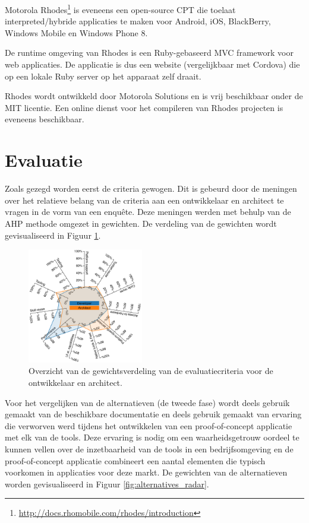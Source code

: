 \documentclass[a4paper]{IEEEconf}
\begin{document}
Motorola Rhodes\footnote{\url{http://docs.rhomobile.com/rhodes/introduction}} is eveneens een open-source CPT die toelaat interpreted/hybride applicaties te maken voor Android, iOS, BlackBerry, Windows Mobile en Windows Phone 8. 

De runtime omgeving van Rhodes is een Ruby-gebaseerd MVC framework voor web applicaties. De applicatie is dus een website (vergelijkbaar met Cordova) die op een lokale Ruby server op het apparaat zelf draait. 

Rhodes wordt ontwikkeld door Motorola Solutions en is vrij beschikbaar onder de MIT licentie. Een online dienst voor het compileren van Rhodes projecten is eveneens beschikbaar.

\section{Evaluatie}

Zoals gezegd worden eerst de criteria gewogen. Dit is gebeurd door de meningen over het relatieve belang van de criteria aan een ontwikkelaar en architect te vragen in de vorm van een enqu\^ete. Deze meningen werden met behulp van de AHP methode omgezet in gewichten. De verdeling van de gewichten wordt gevisualiseerd in Figuur \ref{fig:criteria_radar}. 

\begin{figure}[h!]
    \centering
    \includegraphics[width=0.45\textwidth]{../resources/figs/criteria_radar.pdf}
    \caption{Overzicht van de gewichtsverdeling van de evaluatiecriteria voor de ontwikkelaar en architect.}
    \label{fig:criteria_radar}
\end{figure}

Voor het vergelijken van de alternatieven (de tweede fase) wordt deels gebruik gemaakt van de beschikbare documentatie en deels gebruik gemaakt van ervaring die verworven werd tijdens het ontwikkelen van een proof-of-concept applicatie met elk van de tools. Deze ervaring is nodig om een waarheidsgetrouw oordeel te kunnen vellen over de inzetbaarheid van de tools in een bedrijfsomgeving en de proof-of-concept applicatie combineert een aantal elementen die typisch voorkomen in applicaties voor deze markt. De gewichten van de alternatieven worden gevisualiseerd in Figuur \ref{fig:alternatives_radar}.
\end{document}
